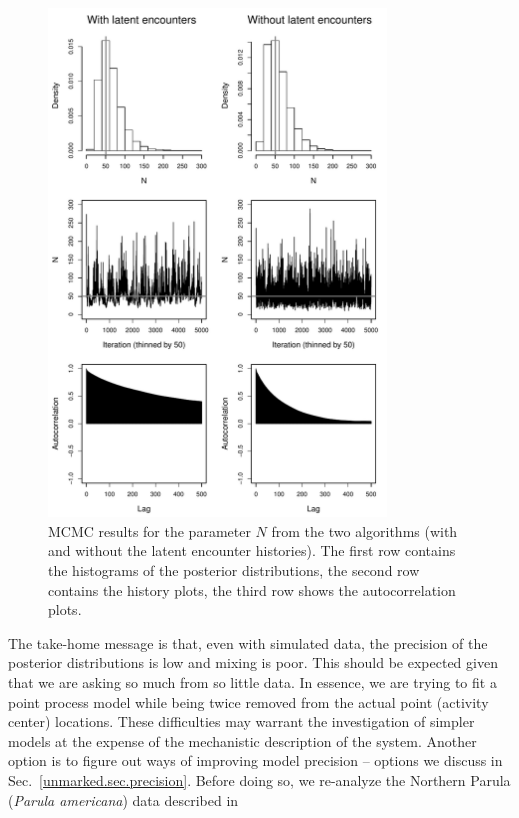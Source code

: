 \begin{figure}
  \centering
  \includegraphics[width=0.8\textwidth]{Ch18-Unmarked/figs/mc1mc2}
  \caption{MCMC results for the parameter $N$ from the two algorithms
    (with and without the latent encounter histories). The first
    row contains the histograms of the posterior distributions, the second row
    contains the history plots, the third row shows the
    autocorrelation plots.}
  \label{unmarked.fig.Nsim}
\end{figure}

The take-home message is that, even with simulated data,
the precision of the posterior distributions is
low and mixing is poor. This should be expected given that we are
asking so much from so little data. In essence, we are trying to fit a
point process model while being twice removed from the actual point
(activity center) locations. These difficulties may warrant the investigation of simpler
models at the expense of the mechanistic description of the system. Another option is to
figure out ways of improving model precision -- options we discuss in
Sec.~\ref{unmarked.sec.precision}. Before doing so, we re-analyze the
Northern Parula ({\it Parula americana}) data
described in \citet{chandler_royle:2012}


